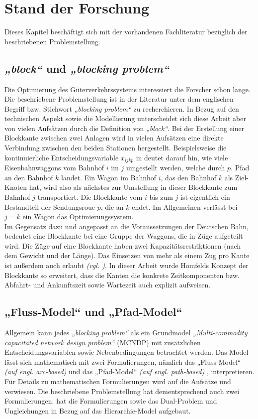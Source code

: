 \chapter{Stand der Forschung}
Dieses Kapitel beschäftigt sich mit der vorhandenen Fachliteratur bezüglich der beschriebenen Problemstellung.
\section{\textit{„block“} und \emph{„blocking problem“}}
Die Optimierung des Güterverkehrssystems interessiert die Forscher schon lange. Die beschriebene Problemstellung ist in der Literatur unter dem englischen Begriff bzw. Stichwort \emph{„blocking problem“} zu recherchieren. In Bezug auf den technischen Aspekt sowie die Modellierung unterscheidet sich diese Arbeit aber von vielen Aufsätzen durch die Definition von \textit{„block“}. Bei der Erstellung einer Blockkante zwischen zwei Anlagen wird in vielen Aufsätzen eine direkte Verbindung zwischen den beiden Stationen hergestellt. Beispielsweise die kontinuierliche Entscheidungsvariable  \(x_{ijkp}\)  in \cite{bodin1980model} deutet darauf hin, wie viele Eisenbahnwaggons vom Bahnhof \(i\) im \(j\) umgestellt werden, welche durch \(p.\) Pfad an den Bahnhof \(k\) landet. Ein Wagon im Bahnhof $i$, das den Bahnhof $k$ als Ziel-Knoten hat, wird also als nächstes zur Umstellung in dieser Blockkante zum Bahnhof $j$ transportiert. Die Blockkante vom $i$ bis zum $j$ ist eigentlich ein Bestandteil der Sendungsroue $p$, die an $k$ endet. Im Allgemeinen verlässt bei $j=k$ ein Wagon das Optimierungssystem.\\
Im Gegensatz dazu und angepasst an die Voraussetzungen der Deutschen Bahn, bedeutet eine Blockkante bei \cite{homfeld2012consolidating} eine Gruppe der Waggons, die in Züge aufgeteilt wird. Die Züge auf eine Blockkante haben zwei Kapazitätsrestriktionen (nach dem Gewicht und der Länge). Das Einsetzen von mehr als einem Zug pro Kante ist außerdem auch erlaubt \textit{(vgl. \cite{homfeld2012consolidating})}. In dieser Arbeit wurde Homfelds Konzept der Blockkante so erweitert, dass die Kanten die konkrete Zeitkomponenten bzw. Abfahrt- und Ankunftszeit sowie Wartezeit auch explizit aufweisen.\\

\section{„Fluss-Model“ und „Pfad-Model“}
Allgemein kann jedes \textit{„blocking problem“} als ein Grundmodel \textit{„Multi-commodity capacitated network design problem“} (MCNDP) mit zusätzlichen Entscheidungsvariablen sowie Nebenbedingungen betrachtet werden. Das Model lässt sich mathematisch mit zwei Formulierungen, nämlich das „Fluss-Model“ \textit{(auf engl. arc-based)} und das „Pfad-Model“ \textit{(auf engl. path-based)} , interpretieren. Für Details zu mathematischen Formulierungen wird auf die Aufsätze \cite{hewitt2010combining} und \cite{frangioni20090} verwiesen. Die beschriebene Problemstellung hat dementsprechend auch zwei Formulierungen. \cite{homfeld2012consolidating} hat die Formulierungen sowie das Dual-Problem und Ungleichungen in Bezug auf das Hierarchie-Model aufgebaut.\\

